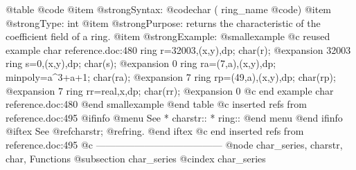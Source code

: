 @table @code
@item @strong{Syntax:}
@code{char (} ring_name @code{)}
@item @strong{Type:}
int
@item @strong{Purpose:}
returns the characteristic of the coefficient field of a ring.
@item @strong{Example:}
@smallexample
@c reused example char reference.doc:480 
  ring r=32003,(x,y),dp;
  char(r);
@expansion{} 32003
  ring s=0,(x,y),dp;
  char(s);
@expansion{} 0
  ring ra=(7,a),(x,y),dp;
  minpoly=a^3+a+1;
  char(ra);
@expansion{} 7
  ring rp=(49,a),(x,y),dp;
  char(rp);
@expansion{} 7
  ring rr=real,x,dp;
  char(rr);
@expansion{} 0
@c end example char reference.doc:480
@end smallexample
@end table
@c inserted refs from reference.doc:495
@ifinfo
@menu
See
* charstr::
* ring::
@end menu
@end ifinfo
@iftex
See
@ref{charstr};
@ref{ring}.
@end iftex
@c end inserted refs from reference.doc:495
@c ---------------------------------------
@node char_series, charstr, char, Functions
@subsection char_series
@cindex char_series

